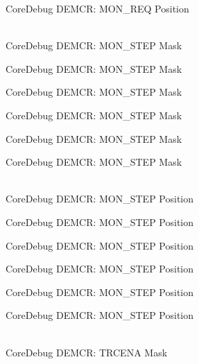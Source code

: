 \begin{DoxyRefList}
\label{deprecated__deprecated000600}%
%
Core\+Debug DEMCR:\+ MON\+\_\+\+REQ Position  
\item[{\parbox[t]{\linewidth}{Global \doxylink{group__CMSIS__CoreDebug_ga2ded814556de96fc369de7ae9a7ceb98}{Core\+Debug\+\_\+\+DEMCR\+\_\+\+MON\+\_\+\+STEP\+\_\+\+Msk} }}]\hfill \\
\label{deprecated__deprecated000050}%
%
Core\+Debug DEMCR:\+ MON\+\_\+\+STEP Mask 

\label{deprecated__deprecated000194}%
%
Core\+Debug DEMCR:\+ MON\+\_\+\+STEP Mask 

\label{deprecated__deprecated000336}%
%
Core\+Debug DEMCR:\+ MON\+\_\+\+STEP Mask 

\label{deprecated__deprecated000412}%
%
Core\+Debug DEMCR:\+ MON\+\_\+\+STEP Mask 

\label{deprecated__deprecated000501}%
%
Core\+Debug DEMCR:\+ MON\+\_\+\+STEP Mask 

\label{deprecated__deprecated000603}%
%
Core\+Debug DEMCR:\+ MON\+\_\+\+STEP Mask  
\item[{\parbox[t]{\linewidth}{Global \doxylink{group__CMSIS__CoreDebug_ga9ae10710684e14a1a534e785ef390e1b}{Core\+Debug\+\_\+\+DEMCR\+\_\+\+MON\+\_\+\+STEP\+\_\+\+Pos} }}]\hfill \\
\label{deprecated__deprecated000049}%
%
Core\+Debug DEMCR:\+ MON\+\_\+\+STEP Position 

\label{deprecated__deprecated000193}%
%
Core\+Debug DEMCR:\+ MON\+\_\+\+STEP Position 

\label{deprecated__deprecated000335}%
%
Core\+Debug DEMCR:\+ MON\+\_\+\+STEP Position 

\label{deprecated__deprecated000411}%
%
Core\+Debug DEMCR:\+ MON\+\_\+\+STEP Position 

\label{deprecated__deprecated000500}%
%
Core\+Debug DEMCR:\+ MON\+\_\+\+STEP Position 

\label{deprecated__deprecated000602}%
%
Core\+Debug DEMCR:\+ MON\+\_\+\+STEP Position  
\item[{\parbox[t]{\linewidth}{Global \doxylink{group__CMSIS__CoreDebug_ga5e99652c1df93b441257389f49407834}{Core\+Debug\+\_\+\+DEMCR\+\_\+\+TRCENA\+\_\+\+Msk} }}]\hfill \\
\label{deprecated__deprecated000046}%
%
Core\+Debug DEMCR:\+ TRCENA Mask 


\end{DoxyRefList}
